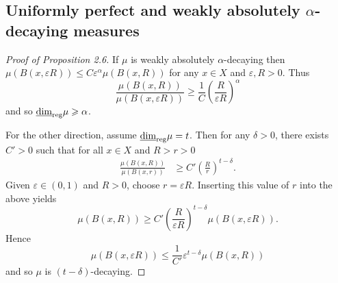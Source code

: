 \subsection{Uniformly perfect and weakly absolutely $\alpha$-decaying measures}





\begin{proof}[Proof of Proposition 2.6]
	If $\mu$ is weakly absolutely $\alpha$-decaying then $\mu(B(x,\varepsilon R)) \le C \varepsilon^{\alpha} \mu(B(x,R))$ for any $x\in X$ and $\varepsilon, R >0$. Thus
	\[
	\frac{\mu(B(x,R))}{\mu(B(x,\varepsilon R))} \ge \frac{1}{C} \left(\frac{R}{\varepsilon R} \right)^{\alpha}
	\]
	and so $\underline{\dim}_{\textup{reg}} \mu \geqslant \alpha$.
	
	For the other direction, assume $\underline{\dim}_{\textup{reg}} \mu = t$. Then for any $\delta > 0$, there exists $C' > 0$ such that for all $x\in X$ and $R>r>0$ 
	\begin{align*}
	\frac{\mu(B(x,R))}{\mu(B(x,r))} &\ge C' \left( \frac{R}{r}\right)^{t - \delta}.
	\end{align*}
	Given $\varepsilon \in (0,1)$ and $R > 0$, choose $r = \varepsilon R$. Inserting this value of $r$ into the above yields 
	\[\mu(B(x,R)) \ge C' \left(\frac{R}{\varepsilon R}\right)^{t-\delta} \mu(B(x,\varepsilon R)).
	\]
	Hence
	\[
	\mu(B(x,\varepsilon R)) \le \frac{1}{C'} \varepsilon^{t - \delta} \mu(B(x,R))  
	\]
	and so $\mu$ is $(t-\delta)$-decaying.
\end{proof}





